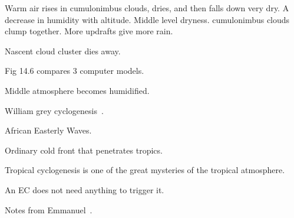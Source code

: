 Warm air rises in cumulonimbus clouds, dries, and then falls down very dry.
A decrease in humidity with altitude. Middle level dryness.
cumulonimbus clouds clump together. More updrafts give more rain.

Nascent cloud cluster dies away.

Fig 14.6 compares 3 computer models.

Middle atmosphere becomes humidified.

William grey cyclogenesis~\cite{gray1975tropical}.

African Easterly Waves.

Ordinary cold front that penetrates tropics.

Tropical cyclogenesis is one of the great mysteries of the tropical atmosphere.

An EC does not need anything to trigger it.

Notes from Emmanuel~\cite{emanuel2005divine}.
